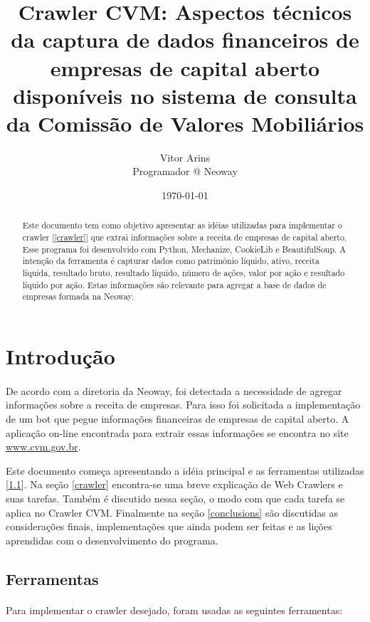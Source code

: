 \documentclass[a4paper, 12pt]{article}
\title{Crawler CVM: Aspectos técnicos da captura de dados financeiros
  de empresas de
  capital aberto disponíveis no sistema de consulta da Comissão de
  Valores Mobiliários}
\author{Vitor Arins  \\
  Programador @ Neoway  \\
	}
\date{\today}
\begin{document}
\maketitle


\begin{abstract}

Este documento tem como objetivo apresentar as idéias utilizadas para
implementar o crawler [\ref{crawler}] que extrai informações sobre a receita de
empresas de capital aberto. Esse programa foi desenvolvido com Python,
Mechanize, CookieLib e BeautifulSoup. A intenção da ferramenta é
capturar dados como patrimônio líquido, ativo, receita líquida,
resultado bruto, resultado líquido, número de ações, valor por ação e
resultado líquido por ação. Estas informações são relevante para
agregar a base de dados de empresas formada na Neoway.
\end{abstract}

\section{Introdução}
\paragraph{}De acordo com a diretoria da Neoway, foi detectada a
necessidade de agregar
informações sobre a receita de empresas. Para isso foi solicitada a
implementação de um bot que pegue informações financeiras de empresas
de capital aberto. A aplicação on-line encontrada para extrair
essas informações se encontra no site
\href{http://www.cvm.gov.br}{www.cvm.gov.br}.

Este documento começa apresentando a idéia principal e as
ferramentas utilizadas [\ref{ferramentas}]. Na seção \ref{crawler}
encontra-se uma breve explicação de Web Crawlers e suas
tarefas. Também é discutido nessa seção, o modo com que cada tarefa se
aplica no Crawler CVM. Finalmente na seção \ref{conclusions} são
discutidas as considerações finais, implementações que ainda podem ser
feitas e as lições aprendidas com o desenvolvimento do programa.

\subsection{Ferramentas}\label{ferramentas}
\paragraph{}Para implementar o crawler desejado, foram usadas as
seguintes ferramentas:
\end{document}
